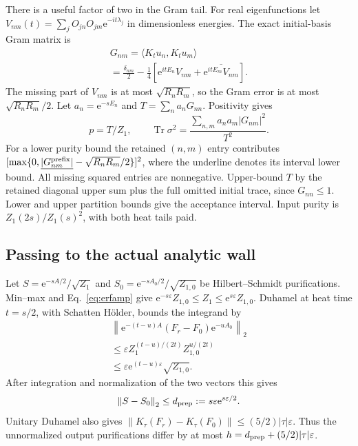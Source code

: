 \documentclass[aps,pra,reprint,superscriptaddress,longbibliography]{revtex4-2}
\newcommand{\Tr}{\operatorname{Tr}}
\newcommand{\ee}{\mathrm e}
\newcommand{\norm}[1]{\left\lVert#1\right\rVert}
\newcommand{\ip}[2]{\langle#1,#2\rangle}
\begin{document}
There is a useful factor of two in the Gram tail. For real
eigenfunctions let
$V_{nm}(t)=\sum_j O_{jn}O_{jm}\ee^{-it\lambda_j}$ in dimensionless
energies. The exact initial-basis Gram matrix is
\begin{equation}
 \begin{gathered}
 G_{nm}=\ip{K_tu_n}{K_tu_m}
 \\=\frac{\delta_{nm}}2-\frac14\left[
       \ee^{itE_n}V_{nm}+\overline{\ee^{itE_m}V_{nm}}\right].
                                                               \label{eq:erfgram}
 \end{gathered}
\end{equation}
The missing part of $V_{nm}$ is at most $\sqrt{R_nR_m}$,
so the Gram error is at most $\sqrt{R_nR_m}/2$.
Let $a_n=\ee^{-sE_n}$ and $T=\sum_na_nG_{nn}$. Positivity gives
\begin{equation}
 p=T/Z_1,\qquad
 \Tr\sigma^2=\frac{\sum_{n,m}a_na_m|G_{nm}|^2}{T^2}.          \label{eq:erfpurity}
\end{equation}
For a lower purity bound the retained $(n,m)$ entry contributes
$[\max\{0,\underline{|G_{nm}^{\rm prefix}|}
-\sqrt{R_nR_m}/2\}]^2$, where the underline denotes its interval
lower bound. All missing squared entries are nonnegative.
Upper-bound $T$ by the retained diagonal
upper sum plus the full omitted initial trace, since $G_{nn}\le1$.
Lower and upper partition bounds give the acceptance interval.
Input purity is $Z_1(2s)/Z_1(s)^2$, with both heat tails paid.

\subsection{Passing to the actual analytic wall}

Let $S=\ee^{-sA/2}/\sqrt{Z_1}$ and
$S_0=\ee^{-sA_0/2}/\sqrt{Z_{1,0}}$ be Hilbert--Schmidt
purifications. Min--max and Eq.~\eqref{eq:erfamp} give
$\ee^{-s\varepsilon}Z_{1,0}\le Z_1\le
\ee^{s\varepsilon}Z_{1,0}$. Duhamel at heat time $t=s/2$,
with Schatten H\"older, bounds the integrand by
\begin{equation}
 \begin{gathered}
 \norm{\ee^{-(t-u)A}(F_r-F_0)\ee^{-uA_0}}_2
 \\
 \le\varepsilon Z_1^{(t-u)/(2t)}Z_{1,0}^{u/(2t)}
 \\
 \le\varepsilon\ee^{(t-u)\varepsilon}\sqrt{Z_{1,0}}.
 \end{gathered}
\end{equation}
After integration and normalization of the two vectors this gives
\begin{equation}
       \norm{S-S_0}_2\le d_{\rm prep}:=s\varepsilon\ee^{s\varepsilon/2}.
                                                               \label{eq:erfprep}
\end{equation}
Unitary Duhamel also gives
$\norm{K_\tau(F_r)-K_\tau(F_0)}\le(5/2)|\tau|\varepsilon$.
Thus the unnormalized output purifications differ by at most
$h=d_{\rm prep}+(5/2)|\tau|\varepsilon$.
\end{document}
